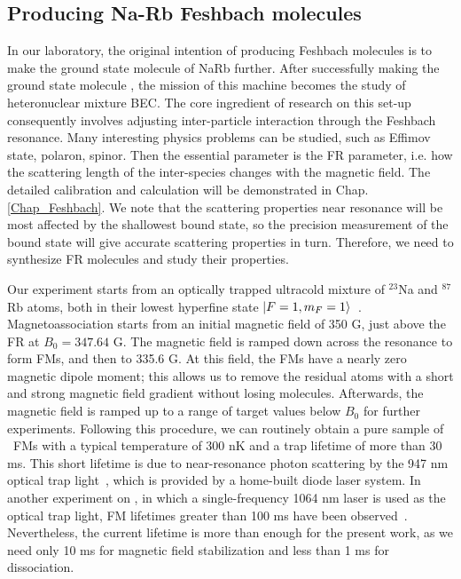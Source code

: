 \subsection{Producing Na-Rb Feshbach molecules}
In our laboratory, the original intention of producing Feshbach molecules is to make the ground state molecule of NaRb further. After successfully making the ground state molecule \cite{guo2016}, the mission of this machine becomes the study of heteronuclear mixture BEC. The core ingredient of research on this set-up consequently involves adjusting inter-particle interaction through the Feshbach resonance. Many interesting physics problems can be studied, such as Effimov state, polaron, spinor. Then the essential parameter is the FR parameter, i.e. how the scattering length of the inter-species changes with the magnetic field. The detailed calibration and calculation will be demonstrated in Chap. \ref{Chap_Feshbach}. We note that the scattering properties near resonance will be most affected by the shallowest bound state, so the precision measurement of the bound state will give accurate scattering properties in turn. Therefore, we need to synthesize FR molecules and study their properties.

Our experiment starts from an optically trapped ultracold mixture of $^{23}$Na and $^{87}$Rb atoms, both in their lowest hyperfine state $\ket{F = 1, m_F = 1}$~\cite{wang2013observation,wang2015formation,jia2020}. Magnetoassociation starts from an initial magnetic field of 350 G, just above the FR at $B_0 = 347.64$ G. The magnetic field is ramped down across the resonance to form FMs, and then to 335.6 G. At this field, the FMs have a nearly zero magnetic dipole moment; this allows us to remove the residual atoms with a short and strong magnetic field gradient without losing molecules. Afterwards, the magnetic field is ramped up to a range of target values below $B_0$ for further experiments. Following this procedure, we can routinely obtain a pure sample of \NaRb~FMs with a typical temperature of 300 nK and a trap lifetime of more than 30 ms. This short lifetime is due to near-resonance photon scattering by the 947 nm optical trap light~\cite{Guo2017,jia2020}, which is provided by a home-built diode laser system. In another experiment on \NaRb, in which a single-frequency 1064 nm laser is used as the optical trap light, FM lifetimes greater than 100 ms have been observed~\cite{Wang2019,guo2021leehuangyang}. Nevertheless, the current lifetime is more than enough for the present work, as we need only 10 ms for magnetic field stabilization and less than 1 ms for dissociation.

